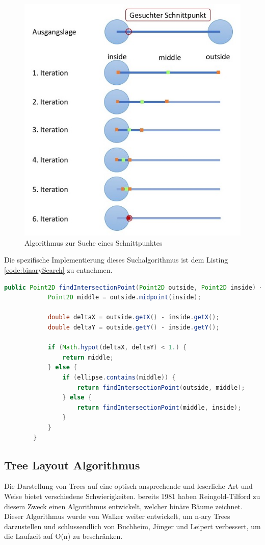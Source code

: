 \documentclass[11pt,a4paper,english,oneside]{book}
\numberwithin{equation}{chapter}
\begin{document}
	\begin{figure}
		\centering
		\includegraphics[width=0.7\linewidth]{assets/images/binarySearch}
		\caption{Algorithmus zur Suche eines Schnittpunktes}
		\label{fig:binarySearch}
	\end{figure}
	
	Die spezifische Implementierung dieses Suchalgorithmus ist dem Listing \ref{code:binarySearch} zu entnehmen.
	
	\begin{lstlisting}[language=java, frame=single,caption={Algorithmus Schnittpunkt Suche}, label={code:binarySearch}]
		public Point2D findIntersectionPoint(Point2D outside, Point2D inside) {
			Point2D middle = outside.midpoint(inside);
		
			double deltaX = outside.getX() - inside.getX();
			double deltaY = outside.getY() - inside.getY();
		
			if (Math.hypot(deltaX, deltaY) < 1.) {
				return middle;
			} else {
				if (ellipse.contains(middle)) {
					return findIntersectionPoint(outside, middle);
				} else {
					return findIntersectionPoint(middle, inside);
				}
			}
		}
	\end{lstlisting}


	\subsection{Tree Layout Algorithmus}
	Die Darstellung von Trees auf eine optisch ansprechende und leserliche Art und Weise bietet verschiedene Schwierigkeiten. bereits 1981 haben Reingold-Tilford \cite{reingold-tilford} zu diesem Zweck einen Algorithmus entwickelt, welcher binäre Bäume zeichnet. Dieser Algorithmus wurde von Walker weiter entwickelt, um n-ary Trees darzustellen und schlussendlich von Buchheim, Jünger und Leipert \cite{tree-algorithm} verbessert, um die Laufzeit auf O(n) zu beschränken. 
	
\end{document}
